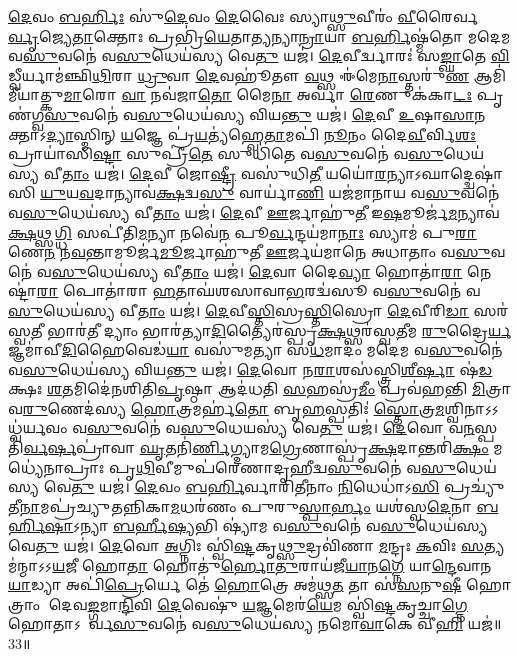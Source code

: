\ul{𑌦𑍇}𑌵𑌂 \ul{𑌬}\ul{𑌰𑍍}𑌹𑌿𑌃 𑌸𑍁॑\ul{𑌦𑍇}𑌵𑌂 \ul{𑌦𑍇}𑌵𑍈𑌃 𑌸𑍍𑌯𑌾\ul{𑌥𑍍𑌸𑍁}𑌵𑍀𑌰𑌂॑ \ul{𑌵𑍀}𑌰𑍈𑌰𑍍𑌵𑌸𑍍𑌤𑍋᳚\ul{𑌰𑍍𑌵𑍃}𑌜𑍍𑌯𑍇\ul{𑌤𑌾}𑌕𑍍𑌤𑍋𑌃 𑌪𑍍𑌰𑌭𑍍𑌰𑌿॑\ul{𑌯𑍇}𑌤𑌾\ul{𑌤𑍍𑌯}𑌨𑍍𑌯𑌾\ul{𑌨𑍍𑌰𑌾}𑌯𑌾 \ul{𑌬}\ul{𑌰𑍍}𑌹𑌿𑌷𑍍𑌮॑𑌤𑍋 𑌮𑌦𑍇𑌮 𑌵\ul{𑌸𑍁}𑌵𑌨𑍇॑ 𑌵\ul{𑌸𑍁}𑌧𑍇𑌯॑𑌸𑍍𑌯 𑌵𑍇\ul{𑌤𑍁} 𑌯𑌜॑।
\ul{𑌦𑍇}𑌵𑍀𑌰𑍍𑌦𑍍𑌵𑌾𑌰𑌃॑ 𑌸\ul{𑌙𑍍𑌘𑌾}𑌤𑍇 \ul{𑌵𑌿}𑌡𑍍𑌵𑍀𑌰𑍍𑌯𑌾𑌮॑𑌞𑍍𑌛𑌿\ul{𑌥𑌿}𑌰𑌾 \ul{𑌧𑍍𑌰𑍁}𑌵𑌾 \ul{𑌦𑍇}𑌵𑌹𑍂॑𑌤𑍗 \ul{𑌵}𑌥𑍍𑌸 𑌈॑𑌮𑍇\ul{𑌨𑌾}𑌸𑍍𑌤𑌰𑍁॑\ul{𑌣} 𑌆𑌮𑌿॑𑌮𑍀𑌯𑌾𑌤𑍍𑌕𑍁\ul{𑌮𑌾}𑌰𑍋 \ul{𑌵𑌾} 𑌨𑌵॑𑌜𑌾\ul{𑌤𑍋} 𑌮𑍈\ul{𑌨𑌾} 𑌅𑌰𑍍𑌵𑌾॑ \ul{𑌰𑍇}𑌣𑍁𑌕॑𑌕𑌾\ul{𑌟𑌃} 𑌪𑍃𑌣॑𑌗𑍍𑌵\ul{𑌸𑍁}𑌵𑌨𑍇॑ 𑌵\ul{𑌸𑍁}𑌧𑍇𑌯॑𑌸𑍍𑌯 𑌵𑌿𑌯\ul{𑌨𑍍𑌤𑍁} 𑌯𑌜॑।
\ul{𑌦𑍇}𑌵𑍀 \ul{𑌉}𑌷𑌾\ul{𑌸𑌾}𑌨𑌕𑍍𑌤𑌾\-𑌽\ul{𑌦𑍍𑌯𑌾}𑌸𑍍𑌮𑌿𑌨𑍍‌ \ul{𑌯}𑌜𑍍𑌞𑍇 𑌪𑍍𑌰॑\ul{𑌯}𑌤𑍍𑌯॑𑌹𑍍𑌵𑍇\ul{𑌤𑌾}𑌮𑌪𑌿॑ \ul{𑌨𑍂}𑌨𑌂 𑌦𑍈\ul{𑌵𑍀}𑌰𑍍𑌵𑌿\ul{𑌶𑌃} 𑌪𑍍𑌰𑌾𑌯𑌾॑𑌸𑌿\ul{𑌷𑍍𑌟𑌾}\ul{} 𑌸𑍁𑌪𑍍𑌰𑍀॑\ul{𑌤𑍇} 𑌸𑍁𑌧𑌿॑𑌤𑍇 𑌵\ul{𑌸𑍁}𑌵𑌨𑍇॑ 𑌵\ul{𑌸𑍁}𑌧𑍇𑌯॑𑌸𑍍𑌯 𑌵𑍀\ul{𑌤𑌾𑌂} 𑌯𑌜॑।
\ul{𑌦𑍇}𑌵𑍀 𑌜𑍋\ul{𑌷𑍍𑌟𑍍𑌰𑍀} 𑌵𑌸𑍁॑𑌧𑌿\ul{𑌤𑍀} 𑌯𑌯𑍋॑\ul{𑌰}𑌨𑍍𑌯𑌾\-𑌽𑌘𑌾𑌦𑍍𑌦𑍍𑌵𑍇𑌷𑌾॑𑌸𑌿 \ul{𑌯𑍁}𑌯\ul{𑌵}𑌦𑌾𑌨𑍍𑌯𑌾𑌵॑\ul{𑌕𑍍𑌷}𑌦𑍍𑌵\ul{𑌸𑍁} 𑌵𑌾𑌰𑍍𑌯𑌾॑\ul{𑌣𑌿} 𑌯𑌜॑𑌮𑌾𑌨𑌾𑌯 𑌵\ul{𑌸𑍁}𑌵𑌨𑍇॑ 𑌵\ul{𑌸𑍁}𑌧𑍇𑌯॑𑌸𑍍𑌯 𑌵𑍀\ul{𑌤𑌾𑌂} 𑌯𑌜॑।
\ul{𑌦𑍇}𑌵𑍀 \ul{𑌊}𑌰𑍍𑌜𑌾𑌹𑍁॑\ul{𑌤𑍀} 𑌇\ul{𑌷}𑌮𑍂𑌰𑍍𑌜॑\ul{𑌮}𑌨𑍍𑌯𑌾𑌵॑\ul{𑌕𑍍𑌷}𑌥𑍍𑌸\ul{𑌗𑍍𑌧𑌿}\ul{} 𑌸𑌪𑍀॑𑌤𑌿\ul{𑌮}𑌨𑍍𑌯𑌾 𑌨𑌵𑍇॑\ul{𑌨} 𑌪𑍂\ul{𑌰𑍍𑌵}𑌨𑍍𑌦𑌯॑𑌮𑌾\ul{𑌨𑌾𑌃} 𑌸𑍍𑌯𑌾𑌮॑ 𑌪𑍁\ul{𑌰𑌾}𑌣𑍇\ul{𑌨} 𑌨\ul{𑌵}𑌨𑍍𑌤𑌾𑌮𑍂𑌰𑍍𑌜॑\ul{𑌮𑍂}𑌰𑍍𑌜𑌾𑌹𑍁॑𑌤𑍀 \ul{𑌊}𑌰𑍍𑌜𑌯॑𑌮𑌾𑌨𑍇 𑌅𑌧𑌾𑌤𑌾𑌂 𑌵\ul{𑌸𑍁}𑌵𑌨𑍇॑ 𑌵\ul{𑌸𑍁}𑌧𑍇𑌯॑𑌸𑍍𑌯 𑌵𑍀\ul{𑌤𑌾𑌂} 𑌯𑌜॑।
\ul{𑌦𑍇}𑌵𑌾 𑌦𑍈\ul{𑌵𑍍𑌯𑌾} 𑌹𑍋𑌤𑌾॑\ul{𑌰𑌾} 𑌨𑍇𑌷𑍍𑌟𑌾॑\ul{𑌰𑌾} 𑌪𑍋𑌤𑌾॑𑌰𑌾 \ul{𑌹}𑌤𑌾𑌘॑𑌶𑌸𑌾𑌵𑌾\ul{𑌭}𑌰𑌦𑍍𑌵॑𑌸𑍂 𑌵\ul{𑌸𑍁}𑌵𑌨𑍇॑ 𑌵\ul{𑌸𑍁}𑌧𑍇𑌯॑𑌸𑍍𑌯 𑌵𑍀\ul{𑌤𑌾𑌂} 𑌯𑌜॑।
\ul{𑌦𑍇}𑌵𑍀\ul{𑌸𑍍𑌤𑌿}𑌸𑍍𑌰\ul{𑌸𑍍𑌤𑌿}𑌸𑍍𑌰𑍋 \ul{𑌦𑍇}𑌵𑍀𑌰𑌿\ul{𑌡𑌾} 𑌸𑌰॑𑌸𑍍𑌵\ul{𑌤𑍀} 𑌭𑌾𑌰॑\ul{𑌤𑍀} 𑌦𑍍𑌯𑌾𑌂 𑌭𑌾𑌰॑𑌤𑍍𑌯𑌾\ul{𑌦𑌿}𑌤𑍍𑌯𑍈𑌰॑𑌸𑍍𑌪𑍃\ul{𑌕𑍍𑌷}𑌥𑍍𑌸𑌰॑𑌸𑍍𑌵\ul{𑌤𑍀}𑌮 \ul{𑌰𑍁}𑌦𑍍𑌰𑍈\ul{𑌰𑍍𑌯}𑌜𑍍𑌞𑌮𑌾॑𑌵𑍀\ul{𑌦𑌿}𑌹𑍈𑌵𑍇𑌡॑\ul{𑌯𑌾} 𑌵𑌸𑍁॑𑌮𑌤𑍍𑌯𑌾 𑌸\ul{𑌧}𑌮𑌾𑌦𑌂॑ 𑌮𑌦𑍇𑌮 𑌵\ul{𑌸𑍁}𑌵𑌨𑍇॑ 𑌵\ul{𑌸𑍁}𑌧𑍇𑌯॑𑌸𑍍𑌯 𑌵𑌿𑌯\ul{𑌨𑍍𑌤𑍁} 𑌯𑌜॑।
\ul{𑌦𑍇}𑌵𑍋 𑌨\ul{𑌰𑌾}𑌶𑌸॑𑌸𑍍𑌤𑍍𑌰𑌿\ul{𑌶𑍀}\ul{𑌰𑍍}𑌷𑌾 𑌷॑\ul{𑌡}𑌕𑍍𑌷𑌃 \ul{𑌶}𑌤𑌮𑌿𑌦𑍇॑𑌨𑌶𑌿𑌤𑌿\ul{𑌪𑍃}𑌷𑍍𑌠𑌾 𑌆𑌦॑𑌧𑌤𑌿 \ul{𑌸}𑌹𑌸𑍍𑌰॑\ul{𑌮𑍀𑌂} 𑌪𑍍𑌰𑌵॑𑌹𑌨𑍍𑌤𑌿 \ul{𑌮𑌿}𑌤𑍍𑌰𑌾𑌵\ul{𑌰𑍁}𑌣𑍇𑌦॑𑌸𑍍𑌯 \ul{𑌹𑍋}𑌤𑍍𑌰𑌮𑌰𑍍\mbox{}𑌹॑\ul{𑌤𑍋} 𑌬𑍃\ul{𑌹}𑌸𑍍𑌪𑌤𑌿𑌃॑ \ul{𑌸𑍍𑌤𑍋}𑌤𑍍𑌰\ul{𑌮}𑌶𑍍𑌵𑌿𑌨𑌾\-𑌽𑌽𑌧𑍍𑌵॑𑌰𑍍𑌯𑌵𑌂 𑌵\ul{𑌸𑍁}𑌵𑌨𑍇॑ 𑌵\ul{𑌸𑍁}𑌧𑍇𑌯𑌸𑍍𑌯॑ 𑌵𑍇\ul{𑌤𑍁} 𑌯𑌜॑।
\ul{𑌦𑍇}𑌵𑍋 𑌵\ul{𑌨}𑌸𑍍𑌪𑌤𑌿॑\ul{𑌰𑍍𑌵}\ul{𑌰𑍍}𑌷𑌪𑍍𑌰𑌾॑𑌵𑌾 \ul{𑌘𑍃}𑌤𑌨𑌿॑\ul{𑌰𑍍𑌣𑌿}𑌗𑍍𑌦𑍍𑌯𑌾𑌮\ul{𑌗𑍍𑌰𑍇}𑌣𑌾𑌸𑍍𑌪𑍃॑\ul{𑌕𑍍𑌷}𑌦𑌾𑌨𑍍𑌤𑌰𑌿॑\ul{𑌕𑍍𑌷𑌂} 𑌮𑌧𑍍𑌯𑍇॑𑌨𑌾𑌪𑍍𑌰𑌾𑌃 𑌪𑍃\ul{𑌥𑌿}𑌵𑍀𑌮𑍁𑌪॑𑌰𑍇𑌣𑌾𑌦𑍃𑌹𑍀𑌦𑍍𑌵\ul{𑌸𑍁}𑌵𑌨𑍇॑ 𑌵\ul{𑌸𑍁}𑌧𑍇𑌯॑𑌸𑍍𑌯 𑌵𑍇\ul{𑌤𑍁} 𑌯𑌜॑।
\ul{𑌦𑍇}𑌵𑌂 \ul{𑌬}\ul{𑌰𑍍}𑌹𑌿𑌰𑍍𑌵𑌾𑌰𑌿॑𑌤𑍀𑌨𑌾𑌂 \ul{𑌨𑌿}𑌧𑍇𑌧𑌾॑𑌽\ul{𑌸𑌿} 𑌪𑍍𑌰𑌚𑍍𑌯𑍁॑𑌤𑍀\ul{𑌨𑌾}𑌮𑌪𑍍𑌰॑\-𑌚𑍍𑌯𑍁𑌤𑌨𑍍𑌨𑌿𑌕𑌾\ul{𑌮}𑌧𑌰॑𑌣𑌂 𑌪𑍁𑌰𑍁\ul{𑌸𑍍𑌪𑌾}\ul{𑌰𑍍}𑌹𑌂 𑌯𑌶॑𑌸𑍍𑌵\ul{𑌦𑍇}𑌨𑌾 \ul{𑌬}\ul{𑌰𑍍}𑌹𑌿\ul{𑌷𑌾}\-𑌽𑌨𑍍𑌯𑌾 \ul{𑌬}\ul{𑌰𑍍}𑌹𑍀\ul{𑌷𑍍𑌯}𑌭𑌿 𑌷𑍍𑌯𑌾॑𑌮 𑌵\ul{𑌸𑍁}𑌵𑌨𑍇॑ 𑌵\ul{𑌸𑍁}𑌧𑍇𑌯॑𑌸𑍍𑌯 𑌵𑍇\ul{𑌤𑍁} 𑌯𑌜॑।
\ul{𑌦𑍇}𑌵𑍋 \ul{𑌅}𑌗𑍍𑌨𑌿𑌃 𑌸𑍍𑌵𑌿॑\ul{𑌷𑍍𑌟}𑌕𑍃\ul{𑌥𑍍𑌸𑍁}𑌦𑍍𑌰𑌵𑌿॑𑌣𑌾 \ul{𑌮}𑌨𑍍𑌦𑍍𑌰𑌃 \ul{𑌕}𑌵𑌿𑌃 \ul{𑌸}𑌤𑍍𑌯𑌮॑𑌨𑍍𑌮𑌾\-𑌽𑌽\ul{𑌯}𑌜𑍀 𑌹𑍋\ul{𑌤𑌾} 𑌹𑍋𑌤𑍁॑\ul{𑌰𑍍}𑌹𑍋\ul{𑌤𑍁}𑌰𑌾𑌯॑𑌜𑍀\ul{𑌯𑌾}𑌨\ul{𑌗𑍍𑌨𑍇} 𑌯𑌾\ul{𑌨𑍍𑌦𑍇}𑌵𑌾𑌨\ul{𑌯𑌾}𑌡𑍍𑌯𑌾 𑌅𑌪𑌿॑\ul{𑌪𑍍𑌰𑍇}𑌰𑍍𑌯𑍇 𑌤𑍇॑ \ul{𑌹𑍋}𑌤𑍍𑌰𑍇 𑌅𑌮॑𑌥𑍍𑌸\ul{𑌤} 𑌤𑌾 𑌸॑\ul{𑌸}𑌨𑍁\ul{𑌷𑍀}\ul{} 𑌹𑍋𑌤𑍍𑌰𑌾𑌂 𑌦𑍇𑌵\ul{𑌙𑍍𑌗}𑌮𑌾\ul{𑌨𑍍𑌦𑌿}𑌵𑌿 \ul{𑌦𑍇}𑌵𑍇𑌷𑍁॑ \ul{𑌯}𑌜𑍍𑌞𑌮𑍇𑌰॑\ul{𑌯𑍇}𑌮 𑌸𑍍𑌵𑌿॑\ul{𑌷𑍍𑌟}𑌕𑍃𑌚𑍍𑌚𑌾\ul{𑌗𑍍𑌨𑍇} 𑌹𑍋𑌤𑌾\-𑌽𑌭𑍂᳚𑌰𑍍𑌵\ul{𑌸𑍁}𑌵𑌨𑍇॑ 𑌵\ul{𑌸𑍁}𑌧𑍇𑌯॑𑌸𑍍𑌯 𑌨𑌮𑍋\ul{𑌵𑌾}𑌕𑍇 𑌵𑍀\ul{𑌹𑌿} 𑌯𑌜॑॥33॥\anuvakamend[𑌯𑌜𑍈𑌕𑌂॑ 𑌚]

